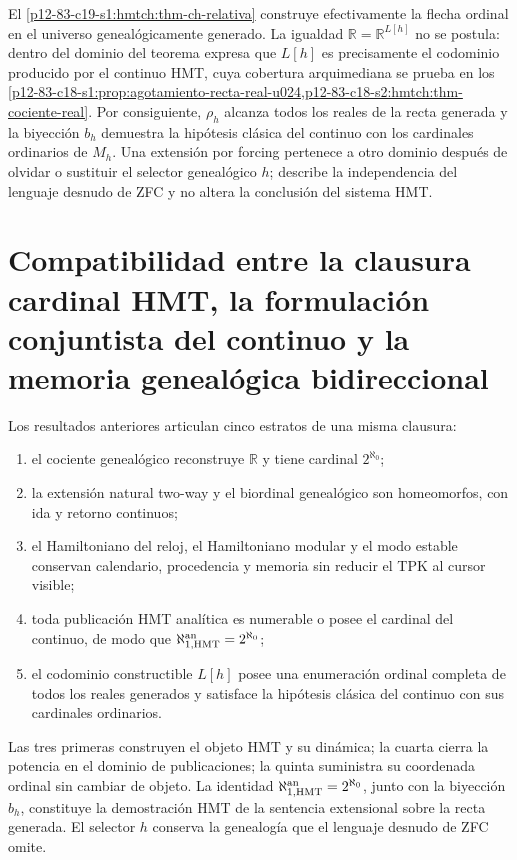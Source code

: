 \begin{remark}
\label{p12-83-c19-s1:hmtch:rem-alcance-relativo}
El \cref{p12-83-c19-s1:hmtch:thm-ch-relativa} construye efectivamente la
flecha ordinal en el universo genealógicamente generado. La igualdad
\(\mathbb R=\mathbb R^{L[h]}\) no se postula: dentro del dominio del teorema
expresa que \(L[h]\) es precisamente el codominio producido por el continuo
HMT, cuya cobertura arquimediana se prueba en los
\cref{p12-83-c18-s1:prop:agotamiento-recta-real-u024,p12-83-c18-s2:hmtch:thm-cociente-real}.
Por consiguiente, \(\rho_h\) alcanza todos los reales de la recta generada y
la biyección \(b_h\) demuestra la hipótesis clásica del continuo con los
cardinales ordinarios de \(M_h\). Una extensión por forcing pertenece a otro
dominio después de olvidar o sustituir el selector genealógico \(h\); describe
la independencia del lenguaje desnudo de ZFC y no altera la conclusión del
sistema HMT.
\end{remark}

\section{Compatibilidad entre la clausura cardinal HMT, la formulación conjuntista del continuo y la memoria genealógica bidireccional}

Los resultados anteriores articulan cinco estratos de una misma clausura:
\begin{enumerate}
 \item el cociente genealógico reconstruye \(\mathbb R\) y tiene cardinal
       \(2^{\aleph_0}\);
 \item la extensión natural two-way y el biordinal genealógico son
       homeomorfos, con ida y retorno continuos;
 \item el Hamiltoniano del reloj, el Hamiltoniano modular y el modo estable
       conservan calendario, procedencia y memoria sin reducir el TPK al
       cursor visible;
 \item toda publicación HMT analítica es numerable o posee el cardinal del
       continuo, de modo que
       \(\aleph_{1,\mathrm{HMT}}^{\rm an}=2^{\aleph_0}\);
 \item el codominio constructible \(L[h]\) posee una enumeración ordinal
       completa de todos los reales generados y satisface la hipótesis
       clásica del continuo con sus cardinales ordinarios.
\end{enumerate}
Las tres primeras construyen el objeto HMT y su dinámica; la cuarta cierra la
potencia en el dominio de publicaciones; la quinta suministra su coordenada
ordinal sin cambiar de objeto. La identidad
\(\aleph_{1,\mathrm{HMT}}^{\rm an}=2^{\aleph_0}\), junto con la biyección
\(b_h\), constituye la demostración HMT de la sentencia extensional sobre la
recta generada. El selector \(h\) conserva la genealogía que el lenguaje
desnudo de ZFC omite.

